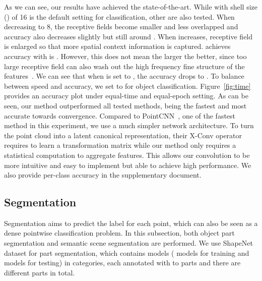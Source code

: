 \documentclass[10pt,twocolumn,letterpaper]{article}
\begin{document}
As we can see, our results have achieved the state-of-the-art. While \ournet with shell size () of 16 is the default setting for classification, other  are also tested. When decreasing  to 8, the receptive fields become smaller and less overlapped and accuracy also decreases slightly but still around . When  increases, receptive field is enlarged so that more spatial context information is captured. \ournet achieves  accuracy with  is . However, this does not mean the larger the better, since too large receptive field can also wash out the high frequency fine structure of the features~\cite{bartlett1990how}. We can see that when  is set to , the accuracy drops to . To balance between speed and accuracy, we set  to  for object classification.
Figure~\ref{fig:time} provides an accuracy plot under equal-time and equal-epoch setting. As can be seen, our method outperformed all tested methods, being the fastest and most accurate towards convergence.
Compared to PointCNN~\cite{li2018pointcnn}, one of the fastest method in this experiment, we use a much simpler network architecture. To turn the point cloud into a latent canonical representation, their X-Conv operator requires to learn a transformation matrix while our method only requires a statistical computation to aggregate features. This allows our convolution to be more intuitive and easy to implement but able to achieve high performance. We also provide per-class accuracy in the supplementary document.

\subsection{Segmentation}
Segmentation aims to predict the label for each point, which can also be seen as a dense pointwise classification problem. In this subsection, both object part segmentation and semantic scene segmentation are performed. We use ShapeNet dataset \cite{yi2016scalable} for part segmentation, which contains  models ( models for training and  models for testing) in  categories, each annotated with  to  parts and there are  different parts in total. 
\end{document}
